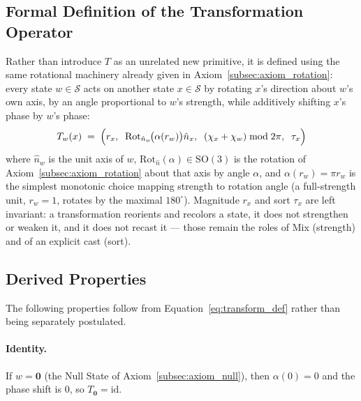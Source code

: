 \documentclass[12pt, a4paper]{article}
\begin{document}
\subsection{Formal Definition of the Transformation Operator}
\label{subsec:transform_definition}
Rather than introduce $T$ as an unrelated new primitive, it is defined
using the same rotational machinery already given in
Axiom~\ref{subsec:axiom_rotation}: every state $w \in \mathcal{S}$
acts on another state $x \in \mathcal{S}$ by rotating $x$'s direction
about $w$'s own axis, by an angle proportional to $w$'s strength, while
additively shifting $x$'s phase by $w$'s phase:
\begin{equation}
    T_w(x)
    \;=\;
    \Bigl(
        r_x,\;\;
        \mathrm{Rot}_{\hat n_w}\!\bigl(\alpha(r_w)\bigr)\hat n_x,\;\;
        (\chi_x + \chi_w) \bmod 2\pi,\;\;
        \tau_x
    \Bigr)
    \label{eq:transform_def}
\end{equation}
where $\hat n_w$ is the unit axis of $w$,
$\mathrm{Rot}_{\hat n}(\alpha) \in \mathrm{SO}(3)$ is the
rotation of Axiom~\ref{subsec:axiom_rotation} about that axis by angle
$\alpha$, and $\alpha(r_w) = \pi r_w$ is the simplest monotonic choice
mapping strength to rotation angle (a full-strength unit, $r_w = 1$,
rotates by the maximal $180^\circ$). Magnitude $r_x$ and sort $\tau_x$ are left invariant:
a transformation reorients and recolors a state, it does not
strengthen or weaken it, and it does not recast it --- those remain
the roles of Mix (strength) and of an explicit cast (sort).

\subsection{Derived Properties}
\label{subsec:transform_properties}
The following properties follow from Equation~\eqref{eq:transform_def}
rather than being separately postulated.

\paragraph{Identity.} If $w = \mathbf{0}$ (the Null State of
Axiom~\ref{subsec:axiom_null}), then $\alpha(0) = 0$ and the phase
shift is $0$, so $T_{\mathbf{0}} = \mathrm{id}$.
\end{document}
